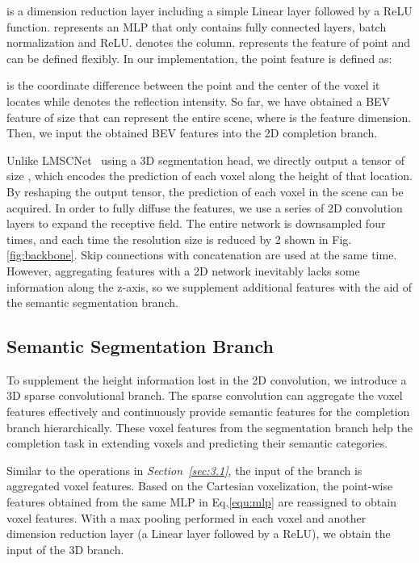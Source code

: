 \documentclass[letterpaper, 10 pt, conference]{ieeeconf}
\begin{document}
 is a dimension reduction layer including a simple Linear layer followed by a ReLU function.  represents an MLP that only contains fully connected layers, batch normalization and ReLU.  denotes the  column.  represents the feature of point  and can be defined flexibly. In our implementation, the point feature  is defined as:

 is the coordinate difference between the point  and the center of the voxel it locates while  denotes the reflection intensity.
So far, we have obtained a BEV feature of size  that can represent the entire scene, where  is the feature dimension. Then, we input the obtained BEV features into the 2D completion branch.

Unlike LMSCNet~\cite{roldao2020lmscnet} using a 3D segmentation head, we directly output a tensor of size , which encodes the prediction of each voxel along the height of that location. By reshaping the output tensor, the prediction of each voxel in the scene can be acquired. In order to fully diffuse the features, we use a series of 2D convolution layers to expand the receptive field. The entire network is downsampled four times, and each time the resolution size is reduced by 2 shown in Fig.\ref{fig:backbone}. Skip connections with concatenation are used at the same time. However, aggregating features with a 2D network inevitably lacks some information along the z-axis, so we supplement additional features with the aid of the semantic segmentation branch.

\subsection{Semantic Segmentation Branch}

To supplement the height information lost in the 2D convolution, we introduce a 3D sparse convolutional branch. The sparse convolution can aggregate the voxel features effectively and continuously provide semantic features for the completion branch hierarchically. These voxel features from the segmentation branch help the completion task in extending voxels and predicting their semantic categories. 

Similar to the operations in \textit{Section~\ref{sec:3.1}}, the input of the branch is aggregated voxel features.  Based on the Cartesian voxelization, the point-wise features obtained from the same MLP in Eq.\ref{equ:mlp} are reassigned to obtain voxel features. With a  max pooling performed in each voxel and another dimension reduction layer  (a Linear layer followed by a ReLU), we obtain the input of the 3D branch.
\end{document}
